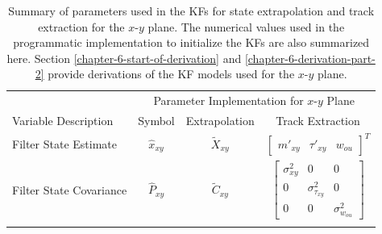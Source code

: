 \begin{table}[!htbp]
\caption{Summary of parameters used in the KFs for state extrapolation and track extraction for the $x$-$y$ plane. The numerical values used in the programmatic implementation to initialize the KFs are also summarized here. Section \ref{chapter-6-start-of-derivation} and \ref{chapter-6-derivation-part-2} provide derivations of the KF models used for the $x$-$y$ plane.}
\begin{center}

\begin{threeparttable}

\begin{tabular}{lccc}
\toprule
& \multicolumn{3}{c}{Parameter Implementation for $x$-$y$ Plane} \\
Variable Description & Symbol  & Extrapolation  & Track Extraction  \\
\hline
\rule{0pt}{3ex}%

Filter State Estimate
& $\hat{x}_{xy}$
& $\tilde{X}_{xy}$
& $\begin{bmatrix} m'_{xy} & \tau'_{xy} & w_{ou} \end{bmatrix}^{T}$
\\
\rule{0pt}{6ex}%

Filter State Covariance
& $\hat{P}_{xy}$ 
& $\tilde{C}_{xy}$ 
& $\begin{bmatrix} \sigma_{xy}^2 & 0 & 0 
                   \\ 0 & \sigma_{\tau_{xy}}^2 & 0 
                    \\ 0 & 0 & \sigma_{w_{ou}}^2 \end{bmatrix}$
\\
\rule{0pt}{4ex}%

        
        



\end{tabular}
\end{threeparttable}
\end{center}
\end{table}

